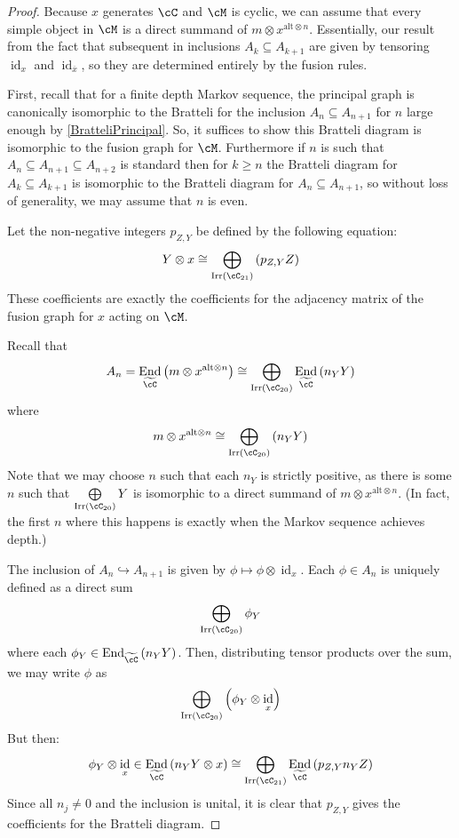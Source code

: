 \documentclass[11pt]{article}
\theoremstyle{plain}
\theoremstyle{definition}
\DeclareMathOperator{\End}{End}
\DeclareMathOperator{\id}{id}
\DeclareMathOperator{\Irr}{Irr}
\newcommand{\xalt}{x^{\text{alt}\otimes n}}
\begin{document}
\begin{proof}
Because $x$ generates $\cC$ and $\cM$ is cyclic, we can assume that every simple object in $\cM$ is a direct summand of $m\otimes \xalt $. Essentially, our result from the fact that subsequent in inclusions $A_k\subseteq A_{k+1}$ are given by tensoring $\id_x$ and $\id_{\overline{x}}$, so they are determined entirely by the fusion rules.

First, recall that for a finite depth Markov sequence, the principal graph is canonically isomorphic to the Bratteli for the inclusion $A_n\subseteq A_{n+1}$ for $n$ large enough by \ref{BratteliPrincipal}. So, it suffices to show this Bratteli diagram is isomorphic to the fusion graph for $\cM$. Furthermore if $n$ is such that $A_n\subseteq A_{n+1}\subseteq A_{n+2}$ is standard then for $k\geq n$ the Bratteli diagram for $A_{k}\subseteq A_{k+1}$ is isomorphic to the Bratteli diagram for $A_n\subseteq A_{n+1}$, so without loss of generality, we may assume that $n$ is even.

Let the non-negative integers $p_{Z,Y}$ be defined by the following equation:
	\[Y\otimes x\cong\bigoplus\limits_{\Irr(\cC_{21})}\left(p_{Z,Y}Z\right)\]
These coefficients are exactly the coefficients for the adjacency matrix of the fusion graph for $x$ acting on $\cM$.

Recall that
$$A_n=\End_{\widetilde{\cC}}\left(m\otimes\xalt\right)\cong \bigoplus\limits_{\Irr(\cC_{20})}\End_{\widetilde{\cC}}\left(n_Y Y\right)$$
where 
$$m \otimes \xalt \cong \bigoplus\limits_{\Irr(\cC_{20})}\left(n_YY\right)$$
	Note that we may choose $n$ such that each $n_Y$ is strictly positive, as there is some $n$ such that $\bigoplus\limits_{\Irr(\cC_{20})}Y$ is isomorphic to a direct summand of $m\otimes \xalt$. (In fact, the first $n$ where this happens is exactly when the Markov sequence achieves depth.) %

The inclusion of $A_n \hookrightarrow A_{n+1}$ is given by $\phi \mapsto \phi \otimes \id_{x}$. Each $\phi \in A_n$ is uniquely defined as a direct sum \[\bigoplus\limits_{\Irr(\cC_{20})}\phi_Y\]
where each $\phi_Y \in \End_{\widetilde{\cC}}\left(n_YY\right)$. Then, distributing tensor products over the sum, we may write $\phi$ as 
	\[\bigoplus_{\Irr(\cC_{20})}\left(\phi_Y \otimes \id_{x}\right)\]
But then:
	\[\phi_Y \otimes \id_{x} \in \End_{\widetilde{\cC}}\left(n_Y Y \otimes x\right)\cong \bigoplus\limits_{\Irr({\cC}_{21})} \End_{\widetilde{\cC}}\left( p_{Z,Y} n_Y Z\right)\]
Since all $n_j\neq 0$ and the inclusion is unital, it is clear that $p_{Z,Y}$ gives the coefficients for the Bratteli diagram.
\end{proof}
\end{document}
